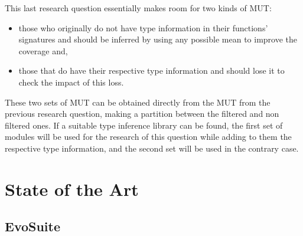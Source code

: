 \documentclass[%
  chapterprefix=false,%
  open=right,%
  twoside=true,%
  paper=a4,%
  logofile={Figures/logo.png},%
  thesistype=master,%
  UKenglish,%
]{se2thesis}
\begin{document}

This last research question essentially makes room for two kinds of MUT:\@
\begin{itemize}
  \item those who originally do not have type information in their functions' signatures and should be inferred by using any possible mean to improve the coverage and, 
  \item those that do have their respective type information and should lose it to check the impact of this loss.
\end{itemize}

These two sets of MUT can be obtained directly from the MUT from the previous research question, making a partition between the filtered and non filtered ones.
If a suitable type inference library can be found, the first set of modules will be used for the research of this question while adding to them the respective type information, and the second set will be used in the contrary case.


\chapter{State of the Art}


\section{EvoSuite}
\end{document}
